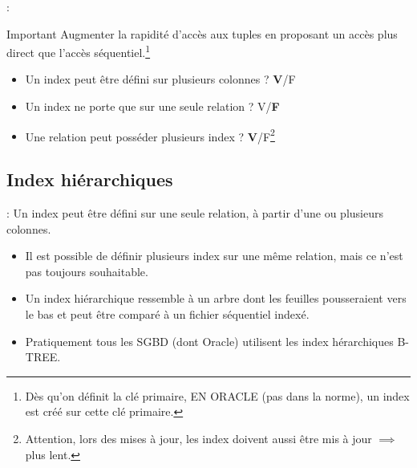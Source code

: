 \documentclass[10pt]{beamer}
\begin{document}
\begin{frame}{\secname : \subsecname}
    \begin{alertblock}{Important}
        Augmenter la rapidité d'accès aux tuples en proposant un accès plus direct que l'accès séquentiel.\footnote{Dès qu'on définit la clé primaire, EN ORACLE (pas dans la norme), un index est créé sur cette clé primaire.}
    \end{alertblock}
    \begin{itemize}
        \item Un index peut être défini sur plusieurs colonnes ? \textbf{V}/F
        \item Un index ne porte que sur une seule relation ? V/\textbf{F}
        \item Une relation peut posséder plusieurs index ? \textbf{V}/F\footnote{Attention, lors des mises à jour, les index doivent aussi être mis à jour $\implies$ plus lent.}
    \end{itemize}
\end{frame}

\subsection{Index hiérarchiques}
\begin{frame}{\secname : \subsecname}
    Un index peut être défini sur une seule relation, à partir d'une ou plusieurs colonnes.
    
    \begin{itemize}
        \item Il est possible de définir plusieurs index sur une même relation, mais ce n'est pas toujours souhaitable.
        \item Un index hiérarchique ressemble à un arbre dont les feuilles pousseraient vers le bas et peut être comparé à un fichier séquentiel indexé.
        \item Pratiquement tous les SGBD (dont Oracle) utilisent les index hérarchiques B-TREE.
    \end{itemize}
\end{frame}
\end{document}
